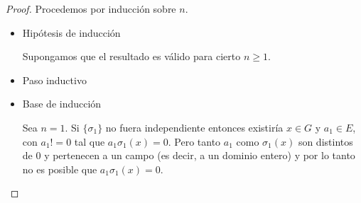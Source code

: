 \begin{proof}
    Procedemos por inducción sobre $n$. 
    
    \begin{itemize}
        \item Hipótesis de inducción\par\null
            Supongamos que el resultado es válido para cierto $n \geq 1$.\par\null
            
        \item Paso inductivo\par\null
        
        \item Base de inducción\par\null
            Sea $n = 1$. Si $\{\sigma_1\}$ no fuera independiente entonces existiría $x \in G$ y $a_1 \in E$, con $a_1 != 0$ 
            tal que $a_1 \sigma_1(x) = 0$. Pero tanto $a_1$ como $\sigma_1(x)$ son distintos de $0$ y pertenecen a un campo
            (es decir, a un dominio entero) y por lo tanto no es posible que $a_1 \sigma_1(x) = 0$.\par\null            
    \end{itemize}
\end{proof}
